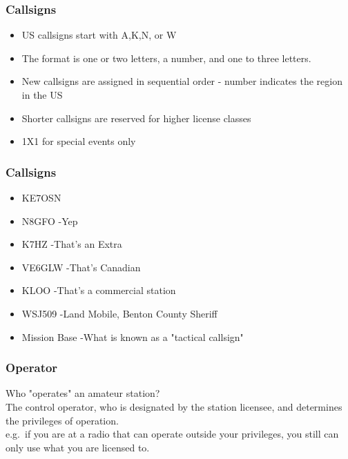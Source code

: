 \documentclass[10pt]{beamer}
\begin{document}
\begin{frame}
\frametitle{Callsigns}
\begin{itemize}
\item US callsigns start with A,K,N, or W
\item The format is one or two letters, a number, and one to three letters.
\item New callsigns are assigned in sequential order - number indicates the region in the US
\item Shorter callsigns are reserved for higher license classes
\item 1X1 for special events only
\end{itemize}
\end{frame}

\begin{frame}
\frametitle{Callsigns}
\begin{itemize}
\item KE7OSN
\item N8GFO \pause -Yep\pause
\item K7HZ \pause -That's an Extra\pause
\item VE6GLW \pause -That's Canadian\pause
\item KLOO \pause -That's a commercial station\pause
\item WSJ509 \pause -Land Mobile, Benton County Sheriff\pause
\item Mission Base \pause -What is known as a "tactical callsign"\pause
\end{itemize}
\end{frame}


\begin{frame}
\frametitle{Operator}
Who "operates" an amateur station? \pause \\
The control operator, who is designated by the station licensee, and determines the privileges of operation.\\
e.g.\ if you are at a radio that can operate outside your privileges, you still can only use what you are licensed to.
\end{frame}
\end{document}
